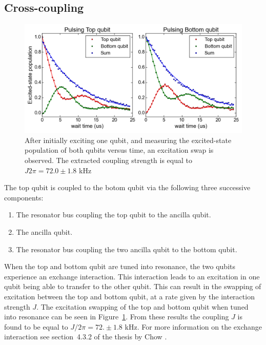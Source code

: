     \subsection{Cross-coupling}
      \label{ssec:cross-coupling}
      \begin{figure}[tb]
        \centering
        \includegraphics[width=\linewidth]{../Figures/Exploring frequency re-use/excitation_swap.png}
        \caption{After initially exciting one qubit, and measuring the excited-state population of both qubits versus time, an excitation swap is observed. The extracted coupling strength is equal to $J2\pi=72.0 \pm 1.8$ kHz}
        \label{fig:excitation swap}
      \end{figure}

      The top qubit is coupled to the botom qubit via the following three successive components:

      \begin{enumerate}
        \item The resonator bus coupling the top qubit to the ancilla qubit.
        \item The ancilla qubit.
        \item The resonator bus coupling the two ancilla qubit to the bottom qubit.
      \end{enumerate}

      When the top and bottom qubit are tuned into resonance, the two qubits experience an exchange interaction. This interaction leads to an excitation in one qubit being able to transfer to the other qubit. This can result in the swapping of excitation between the top and bottom qubit, at a rate given by the interaction strength $J$. The excitation swapping of the top and bottom qubit when tuned into resonance can be seen in Figure~\ref{fig:excitation swap}. From these results the coupling $J$ is found to be equal to $J/2\pi=72. \pm 1.8$ kHz. For more information on the exchange interaction see section~4.3.2 of the thesis by Chow \cite{Chow}.

